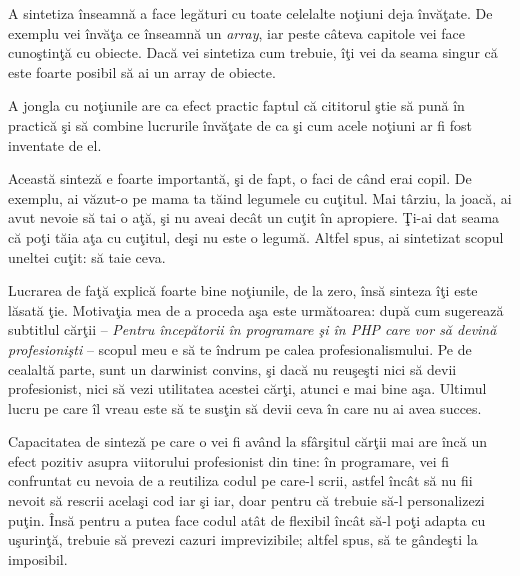 A sintetiza înseamnă a face legături cu toate celelalte noţiuni
deja învăţate. De exemplu vei învăţa ce înseamnă un \textsl{array}, iar peste
câteva capitole vei face cunoştinţă cu obiecte. Dacă vei sintetiza
cum trebuie, îţi vei da seama singur că este foarte posibil
să ai un array de obiecte.

A jongla cu noţiunile are ca efect practic faptul că cititorul ştie
să pună în practică şi să combine lucrurile învăţate de ca şi cum
acele noţiuni ar fi fost inventate de el.


Această sinteză e foarte importantă, şi de fapt, o faci de când erai
copil. De exemplu, ai văzut-o pe mama ta tăind legumele cu cuţitul.
Mai târziu, la joacă, ai avut nevoie să tai o aţă, şi nu aveai decât
un cuţit în apropiere. Ţi-ai dat seama că poţi tăia aţa cu cuţitul,
deşi nu este o legumă. Altfel spus, ai sintetizat scopul uneltei
{\glqq}cuţit{\grqq}: să taie ceva.

Lucrarea de faţă explică foarte bine noţiunile, de la zero, însă
sinteza îţi este lăsată ţie. Motivaţia mea de a proceda aşa este următoarea:
după cum sugerează subtitlul cărţii -- \textit{Pentru începătorii în programare şi în PHP care vor să devină profesionişti} -- scopul meu e să te îndrum pe calea profesionalismului.
Pe de cealaltă parte, sunt un darwinist convins, şi dacă nu reuşeşti
nici să devii profesionist, nici să vezi utilitatea acestei cărţi, atunci
e mai bine aşa. Ultimul lucru pe care îl vreau este să te susţin
să devii ceva în care nu ai avea succes.

Capacitatea de sinteză pe care o vei fi având la sfârşitul cărţii
mai are încă un efect pozitiv asupra viitorului profesionist din tine:
în programare, vei fi confruntat cu nevoia de a reutiliza codul pe care-l scrii, astfel
încât să nu fii nevoit să rescrii acelaşi cod iar şi iar, doar pentru
că trebuie să-l personalizezi puţin. Însă pentru a putea face
codul atât de flexibil încât să-l poţi adapta cu uşurinţă, trebuie
să prevezi cazuri {\glqq}imprevizibile{\grqq}; altfel spus, să te gândeşti
la imposibil.


